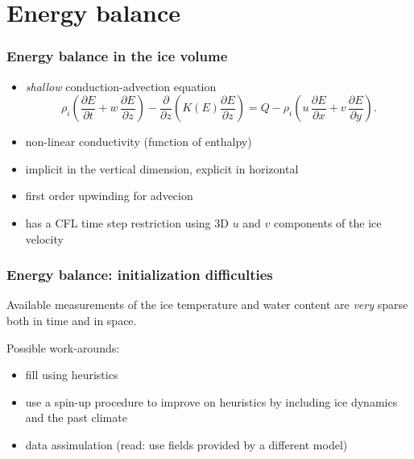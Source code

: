 \documentclass[hide notes,intlimits]{beamer}
\newcommand{\diff}[2]{\frac{\partial #1}{\partial #2}}
\begin{document}
\section{Energy balance}
\label{sec:energy-balance}

\begin{frame}
  \frametitle{Energy balance in the ice volume}
  \begin{itemize}
  \item \emph{shallow} conduction-advection equation
    \begin{equation}
      \label{eq:1}
      \rho_{i} \left( \diff{E}{t} + w\,\diff{E}{z} \right) - \diff{}{z}\left( K(E) \diff{E}{z} \right) = Q - \rho_{i} \left( u\,\diff{E}{x} + v\,\diff{E}{y} \right).
    \end{equation}
  \item non-linear conductivity (function of enthalpy)
  \item implicit in the vertical dimension, explicit in horizontal
  \item first order upwinding for advecion
  \item has a CFL time step restriction using 3D $u$ and $v$
    components of the ice velocity
  \end{itemize}
\end{frame}

\begin{frame}
  \frametitle{Energy balance: initialization difficulties}

  Available measurements of the ice temperature and water content are
  \emph{very} sparse both in time and in space.

  Possible work-arounds:
  \begin{itemize}
  \item fill using heuristics
  \item use a spin-up procedure to improve on heuristics by including
    ice dynamics and the past climate
  \item data assimulation (read: use fields provided by a different
    model)
  \end{itemize}
\end{frame}

\end{document}
